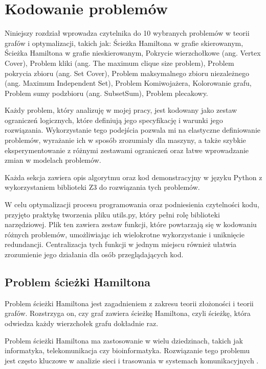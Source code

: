 \chapter{Kodowanie problemów}

Niniejszy rozdział wprowadza czytelnika do 10 wybranych problemów w teorii grafów i optymalizacji, takich jak:
Ścieżka Hamiltona w grafie skierowanym,
Ścieżka Hamiltona w grafie nieskierowanym, 
Pokrycie wierzchołkowe (ang. Vertex Cover), 
Problem kliki (ang. The maximum clique size problem), 
Problem pokrycia zbioru (ang. Set Cover), 
Problem maksymalnego zbioru niezależnego (ang. Maximum Independent Set), 
Problem Komiwojażera, 
Kolorowanie grafu, 
Problem sumy podzbioru (ang. SubsetSum), 
Problem plecakowy.

Każdy problem, który analizuję w mojej pracy, jest kodowany jako zestaw ograniczeń logicznych, które definiują jego specyfikację i warunki jego rozwiązania. Wykorzystanie tego podejścia pozwala mi na elastyczne definiowanie problemów, wyrażanie ich w sposób zrozumiały dla maszyny, a także szybkie eksperymentowanie z różnymi zestawami ograniczeń oraz łatwe wprowadzanie zmian w modelach problemów.

Każda sekcja zawiera opis algorytmu oraz kod demonstracyjny w języku Python z wykorzystaniem biblioteki Z3 do rozwiązania tych problemów.

W celu optymalizacji procesu programowania oraz podniesienia czytelności kodu, przyjęto praktykę tworzenia pliku utils.py, który pełni rolę biblioteki narzędziowej. Plik ten zawiera zestaw funkcji, które powtarzają się w kodowaniu różnych problemów, umożliwiając ich wielokrotne wykorzystanie i uniknięcie redundancji. Centralizacja tych funkcji w jednym miejscu również ułatwia zrozumienie jego działania dla osób przeglądających kod. 

\section{Problem ścieżki Hamiltona}

Problem ścieżki Hamiltona jest zagadnieniem z zakresu teorii złożoności i teorii grafów. Rozstrzyga on, czy graf zawiera ścieżkę Hamiltona, czyli ścieżkę, która odwiedza każdy wierzchołek grafu dokładnie raz.

Problem ścieżki Hamiltona ma zastosowanie w wielu dziedzinach, takich jak informatyka, telekomunikacja czy bioinformatyka. Rozwiązanie tego problemu jest często kluczowe w analizie sieci i trasowania w systemach komunikacyjnych \cite{enwiki:1190136070}.

